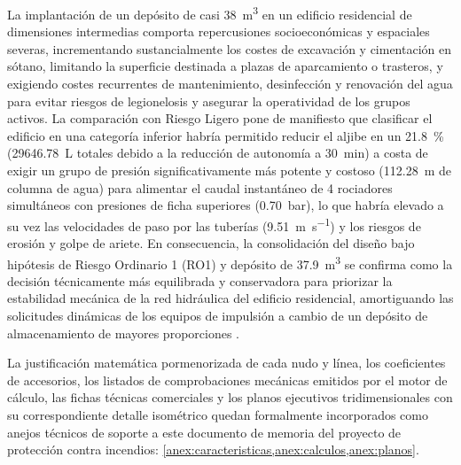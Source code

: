 \documentclass[12pt,a4paper]{article}
\begin{document}
La implantación de un depósito de casi \SI{38}{\meter\cubed} en un edificio residencial de dimensiones intermedias comporta repercusiones socioeconómicas y espaciales severas, incrementando sustancialmente los costes de excavación y cimentación en sótano, limitando la superficie destinada a plazas de aparcamiento o trasteros, y exigiendo costes recurrentes de mantenimiento, desinfección y renovación del agua para evitar riesgos de legionelosis y asegurar la operatividad de los grupos activos. La comparación con Riesgo Ligero pone de manifiesto que clasificar el edificio en una categoría inferior habría permitido reducir el aljibe en un \SI{21.8}{\percent} (\SI{29646.78}{\liter} totales debido a la reducción de autonomía a \SI{30}{\minute}) a costa de exigir un grupo de presión significativamente más potente y costoso (\SI{112.28}{\meter} de columna de agua) para alimentar el caudal instantáneo de 4 rociadores simultáneos con presiones de ficha superiores (\SI{0.70}{\bar}), lo que habría elevado a su vez las velocidades de paso por las tuberías (\SI{9.51}{\meter\per\second}) y los riesgos de erosión y golpe de ariete. En consecuencia, la consolidación del diseño bajo hipótesis de Riesgo Ordinario 1 (RO1) y depósito de \SI{37.9}{\meter\cubed} se confirma como la decisión técnicamente más equilibrada y conservadora para priorizar la estabilidad mecánica de la red hidráulica del edificio residencial, amortiguando las solicitudes dinámicas de los equipos de impulsión a cambio de un depósito de almacenamiento de mayores proporciones \parencite{UNE_EN_12845}.

La justificación matemática pormenorizada de cada nudo y línea, los coeficientes de accesorios, los listados de comprobaciones mecánicas emitidos por el motor de cálculo, las fichas técnicas comerciales y los planos ejecutivos tridimensionales con su correspondiente detalle isométrico quedan formalmente incorporados como anejos técnicos de soporte a este documento de memoria del proyecto de protección contra incendios: \cref{anex:caracteristicas,anex:calculos,anex:planos}.




\cleardoublepage
\printbibliography[title={Bibliografía},heading=bibintoc]

\label{anex:caracteristicas}





\label{anex:calculos}


\label{anex:planos}





\end{document}
